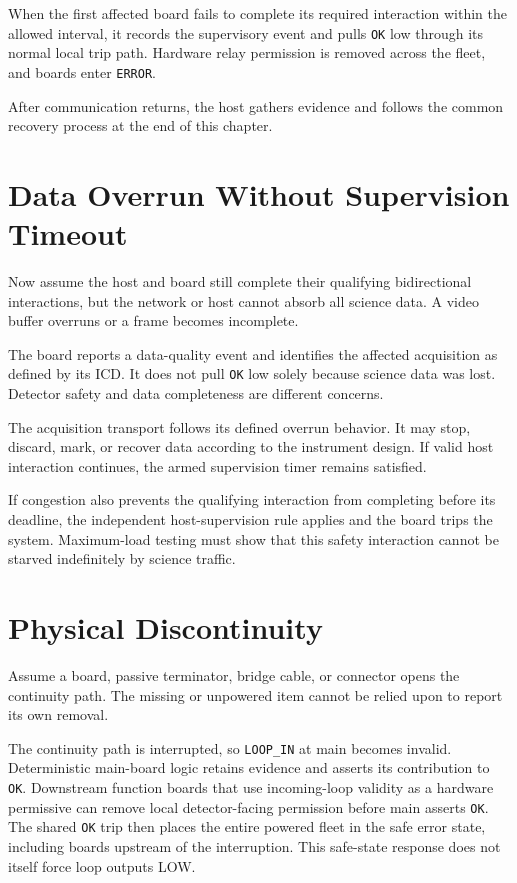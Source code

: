 When the first affected board fails to complete its required interaction within the allowed interval, it records the supervisory event and pulls \texttt{OK} low through its normal local trip path. Hardware relay permission is removed across the fleet, and boards enter \texttt{ERROR}.

After communication returns, the host gathers evidence and follows the common recovery process at the end of this chapter.

\section{Data Overrun Without Supervision Timeout}

Now assume the host and board still complete their qualifying bidirectional interactions, but the network or host cannot absorb all science data. A video buffer overruns or a frame becomes incomplete.

The board reports a data-quality event and identifies the affected acquisition as defined by its ICD. It does not pull \texttt{OK} low solely because science data was lost. Detector safety and data completeness are different concerns.

The acquisition transport follows its defined overrun behavior. It may stop, discard, mark, or recover data according to the instrument design. If valid host interaction continues, the armed supervision timer remains satisfied.

If congestion also prevents the qualifying interaction from completing before its deadline, the independent host-supervision rule applies and the board trips the system. Maximum-load testing must show that this safety interaction cannot be starved indefinitely by science traffic.

\section{Physical Discontinuity}

Assume a board, passive terminator, bridge cable, or connector opens the continuity path. The missing or unpowered item cannot be relied upon to report its own removal.

The continuity path is interrupted, so \texttt{LOOP\_IN} at main becomes invalid. Deterministic main-board logic retains evidence and asserts its contribution to \texttt{OK}. Downstream function boards that use incoming-loop validity as a hardware permissive can remove local detector-facing permission before main asserts \texttt{OK}. The shared \texttt{OK} trip then places the entire powered fleet in the safe error state, including boards upstream of the interruption. This safe-state response does not itself force loop outputs LOW.

